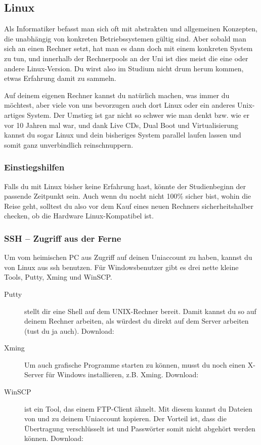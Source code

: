 
\subsection{Linux}
	\label{linux}
	Als Informatiker befasst man sich oft mit abstrakten und allgemeinen Konzepten, die unabhängig von konkreten Betriebssystemen gültig sind. Aber sobald man sich an einen Rechner setzt, hat man es dann doch mit einem konkreten System zu tun, und innerhalb der Rechnerpools an der Uni ist dies meist die eine oder andere Linux-Version. Du wirst also im Studium nicht drum herum kommen, etwas Erfahrung damit zu sammeln.

	Auf deinem eigenen Rechner kannst du natürlich machen, was immer du möchtest, aber viele von uns bevorzugen auch dort Linux oder ein anderes Unix-artiges System. Der Umstieg ist gar nicht so schwer wie man denkt bzw. wie er vor 10 Jahren mal war, und dank Live CDs, Dual Boot und Virtualisierung kannst du sogar Linux und dein bisheriges System parallel laufen lassen und somit ganz unverbindlich reinschnuppern.

	\subsubsection{Einstiegshilfen}
		Falls du mit Linux bisher keine Erfahrung hast, könnte der Studienbeginn der passende Zeitpunkt sein. Auch wenn du nocht nicht 100\% sicher bist, wohin die Reise geht, solltest du also vor dem Kauf eines neuen Rechners sicherheitshalber checken, ob die Hardware Linux-Kompatibel ist.

	\subsubsection{SSH -- Zugriff aus der Ferne}
		Um vom heimischen PC aus Zugriff auf deinen Uniaccount zu haben, kannst du von Linux aus ssh benutzen. Für Windowsbenutzer gibt es drei nette kleine Tools, Putty, Xming und WinSCP. %

		\begin{description}
			\item[Putty] stellt dir eine Shell auf dem UNIX-Rechner bereit. Damit kannst du so auf deinem Rechner arbeiten, als würdest du direkt
			  auf dem Server arbeiten (tust du ja auch).  Download: 
			\item[Xming] Um auch grafische Programme starten zu können, musst du noch einen X-Server für Windows
			  installieren, z.B. Xming. Download: 
			\item[WinSCP] ist ein Tool, das einem FTP-Client ähnelt. Mit diesem kannst du Dateien von und zu deinem Uniaccount kopieren. Der Vorteil ist, dass die Übertragung verschlüsselt ist und Passwörter somit nicht abgehört werden können. Download: 
		\end{description}

